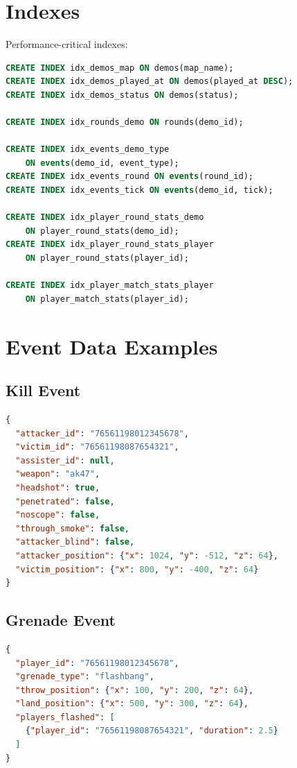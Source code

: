 \section{Indexes}

Performance-critical indexes:

\begin{lstlisting}[language=SQL]
CREATE INDEX idx_demos_map ON demos(map_name);
CREATE INDEX idx_demos_played_at ON demos(played_at DESC);
CREATE INDEX idx_demos_status ON demos(status);

CREATE INDEX idx_rounds_demo ON rounds(demo_id);

CREATE INDEX idx_events_demo_type 
    ON events(demo_id, event_type);
CREATE INDEX idx_events_round ON events(round_id);
CREATE INDEX idx_events_tick ON events(demo_id, tick);

CREATE INDEX idx_player_round_stats_demo 
    ON player_round_stats(demo_id);
CREATE INDEX idx_player_round_stats_player 
    ON player_round_stats(player_id);

CREATE INDEX idx_player_match_stats_player 
    ON player_match_stats(player_id);
\end{lstlisting}

\section{Event Data Examples}

\subsection{Kill Event}

\begin{lstlisting}[language=json]
{
  "attacker_id": "76561198012345678",
  "victim_id": "76561198087654321",
  "assister_id": null,
  "weapon": "ak47",
  "headshot": true,
  "penetrated": false,
  "noscope": false,
  "through_smoke": false,
  "attacker_blind": false,
  "attacker_position": {"x": 1024, "y": -512, "z": 64},
  "victim_position": {"x": 800, "y": -400, "z": 64}
}
\end{lstlisting}

\subsection{Grenade Event}

\begin{lstlisting}[language=json]
{
  "player_id": "76561198012345678",
  "grenade_type": "flashbang",
  "throw_position": {"x": 100, "y": 200, "z": 64},
  "land_position": {"x": 500, "y": 300, "z": 64},
  "players_flashed": [
    {"player_id": "76561198087654321", "duration": 2.5}
  ]
}
\end{lstlisting}
